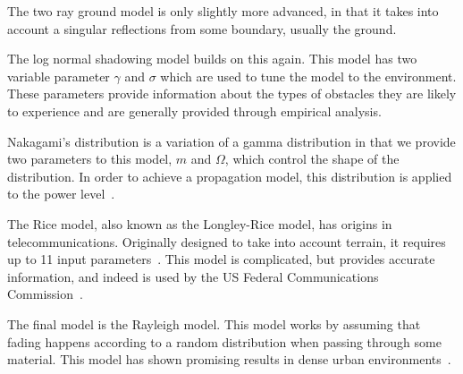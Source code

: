     The two ray ground model is only slightly more advanced, in that it takes into account a singular reflections from some boundary, usually the ground.

    The log normal shadowing model builds on this again. This model has two variable parameter $\gamma$ and $\sigma$ which are used to tune the model to the environment. These parameters provide information about the types of obstacles they are likely to experience and are generally provided through empirical analysis. 

    Nakagami's distribution is a variation of a gamma distribution in that we provide two parameters to this model, $m$ and $\Omega$, which control the shape of the distribution. In order to achieve a propagation model, this distribution is applied to the power level~\cite{nakagamipowerlevel}.

    The Rice model, also known as the Longley-Rice model, has origins in telecommunications. Originally designed to take into account terrain, it requires up to 11 input parameters~\cite{ricemodel}. This model is complicated, but provides accurate information, and indeed is used by the US Federal Communications Commission~\cite{fcclongleyrice}.

    The final model is the Rayleigh model. This model works by assuming that fading happens according to a random distribution when passing through some material. This model has shown promising results in dense urban environments~\cite{rayleighmanhattan}.



